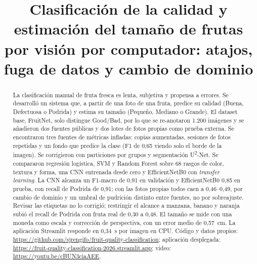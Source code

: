 \documentclass[conference,a4paper]{IEEEtran}
\begin{document}
\title{Clasificación de la calidad y estimación del tamaño de frutas por visión por computador: atajos, fuga de datos y cambio de dominio}

\author{
\and
{}
\and
{}
}

\maketitle

\begin{abstract}
La clasificación manual de fruta fresca es lenta, subjetiva y propensa a errores. Se desarrolló un
sistema que, a partir de una foto de una fruta, predice su calidad (Buena, Defectuosa o Podrida) y
estima su tamaño (Pequeño, Mediano o Grande). El dataset base, FruitNet, solo distingue Good/Bad, por lo
que se re-anotaron 1.200 imágenes y se añadieron dos fuentes públicas y dos lotes de fotos propias
como prueba externa. Se encontraron tres fuentes de métricas infladas: copias aumentadas, sesiones de fotos
repetidas y un fondo que predice la clase (F1 de 0,65 viendo solo el borde de la imagen). Se
corrigieron con particiones por grupos y segmentación U\textsuperscript{2}-Net. Se compararon
regresión logística, SVM y Random Forest sobre 68 rasgos de color, textura y forma, una CNN entrenada
desde cero y EfficientNetB0 con \emph{transfer learning}. La CNN alcanza un F1-macro de 0,91 en
validación y EfficientNetB0 0,85 en prueba, con recall de Podrida de 0,91; con las fotos propias todos
caen a 0,46--0,49, por cambio de dominio y un umbral de pudrición distinto entre fuentes, no por
sobreajuste. Revisar las etiquetas no lo corrigió; restringir el alcance a manzana, banano y naranja
subió el recall de Podrida con fruta real de 0,30 a 0,48. El tamaño se mide con una moneda como escala
y corrección de perspectiva, con un error medio de 0,57~cm. La aplicación Streamlit responde en
0,34~s por imagen en CPU. Código y datos propios: \url{https://github.com/sjrengifo/fruit-quality-classification}; aplicación desplegada: \url{https://fruit-quality-classification-2026.streamlit.app}; video: \url{https://youtu.be/cBUN3ciaAEE}.
\end{abstract}
\end{document}
